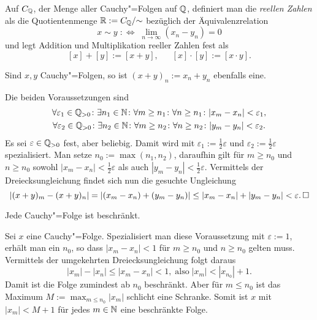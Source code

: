 \begin{Definition}\newlinefirst
Auf $C_\mathbb Q$, der Menge aller Cauchy"=Folgen auf $\mathbb Q$, definiert man
die \emph{reellen Zahlen} als die Quotientenmenge $\mathbb R:=C_\mathbb Q/{\sim}$
bezüglich der Äquivalenzrelation
\[x\sim y \;:\Leftrightarrow\; \lim_{n\to\infty}(x_n-y_n) = 0\]
und legt Addition und Multiplikation reeller Zahlen fest als
\[[x]+[y] := [x+y],\quad\;\; [x]\cdot [y] := [x\cdot y].\]
\end{Definition}

\begin{Satz}
Sind $x,y$ Cauchy"=Folgen, so ist $(x+y)_n := x_n+y_n$ ebenfalls eine.
\end{Satz}
\begin{Beweis}
Die beiden Voraussetzungen sind
\begin{gather*}
\forall\varepsilon_1\in\mathbb Q_{>0}\colon\exists n_1\in\mathbb N\colon
  \forall m\ge n_1\colon\forall n\ge n_1\colon |x_m-x_n|<\varepsilon_1,\\
\forall\varepsilon_2\in\mathbb Q_{>0}\colon\exists n_2\in\mathbb N\colon
  \forall m\ge n_2\colon\forall n\ge n_2\colon |y_m-y_n|<\varepsilon_2.
\end{gather*}
Es sei $\varepsilon\in\mathbb Q_{>0}$ fest, aber beliebig. Damit wird mit
$\varepsilon_1:=\tfrac{1}{2}\varepsilon$ und $\varepsilon_2:=\tfrac{1}{2}\varepsilon$
spezialisiert. Man setze $n_0:=\max(n_1,n_2)$, daraufhin gilt für $m\ge n_0$ und $n\ge n_0$ sowohl
$|x_m-x_n|<\tfrac{1}{2}\varepsilon$ als auch $|y_m-y_n|<\tfrac{1}{2}\varepsilon$.
Vermittels der Dreiecksungleichung findet sich nun die gesuchte Ungleichung
\[|(x+y)_m - (x+y)_n| = |(x_m-x_n) + (y_m-y_n)| \le |x_m-x_n| + |y_m-y_n| < \varepsilon.\,\Box\]
\end{Beweis}

\begin{Satz}
Jede Cauchy"=Folge ist beschränkt.
\end{Satz}
\begin{Beweis}
Sei $x$ eine Cauchy"=Folge. Spezialisiert man diese Voraussetzung mit
$\varepsilon:=1$, erhält man ein $n_0$, so dass $|x_m-x_n|<1$ für
$m\ge n_0$ und $n\ge n_0$ gelten muss. Vermittels der umgekehrten
Dreiecksungleichung folgt daraus
\[|x_m|-|x_n| \le |x_m-x_n| < 1,\;\text{also}\; |x_m| < |x_{n_0}| + 1.\]
Damit ist die Folge zumindest ab $n_0$ beschränkt. Aber für
$m\le n_0$ ist das Maximum $M:=\max_{m\le n_0} |x_m|$ schlicht eine
Schranke. Somit ist $x$ mit $|x_m| < M + 1$ für jedes $m\in\mathbb N$
eine beschränkte Folge.\,\qedsymbol
\end{Beweis}

